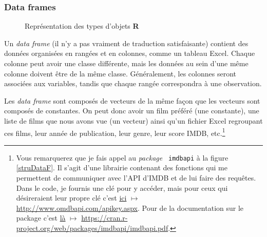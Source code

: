 \documentclass[10.5pt,a4paper]{article}
\newcommand{\rcode}[1]{\texttt{\color{rstudio} #1}}
\begin{document}
    
    \subsubsection{Data frames}
    
    \begin{figure}
      \centering
      \caption{Représentation des types d'objets \textbf{R}}
      \label{lego}
    \end{figure}
    
    Un \emph{data frame} (il n'y a pas vraiment de traduction satisfaisante) contient des données organisées en rangées et en colonnes, comme un tableau Excel. Chaque colonne peut avoir une classe différente, mais les données au sein d’une même colonne doivent être de la même classe. Généralement, les colonnes seront associées aux variables, tandis que chaque rangée correspondra à une observation. 
    
    Les \emph{data frame} sont composés de vecteurs de la même façon que les vecteurs sont composés de constantes. On peut donc avoir un film préféré (une constante), une liste de films que nous avons vue (un vecteur) ainsi qu'un fichier Excel regroupant ces films, leur année de publication, leur genre, leur score IMDB, etc.\footnote{Vous remarquerez que je fais appel au \emph{package} \rcode{imdbapi} à la figure \ref{struDataF}. Il s'agit d'une librairie contenant des fonctions qui me permettent de communiquer avec l'API d'IMDB et de lui faire des requêtes. Dans le code, je fournis une clé pour y accéder, mais pour ceux qui désireraient leur propre clé c'est \href{http://www.omdbapi.com/apikey.aspx}{ici} $\mapsto$ \href{http://www.omdbapi.com/apikey.aspx}{http://www.omdbapi.com/apikey.aspx}. Pour de la documentation sur le package c'est \href{https://cran.r-project.org/web/packages/imdbapi/imdbapi.pdf}{là} $\mapsto$ \href{https://cran.r-project.org/web/packages/imdbapi/imdbapi.pdf}{https://cran.r-project.org/web/packages/imdbapi/imdbapi.pdf}.}
    
\end{document}
